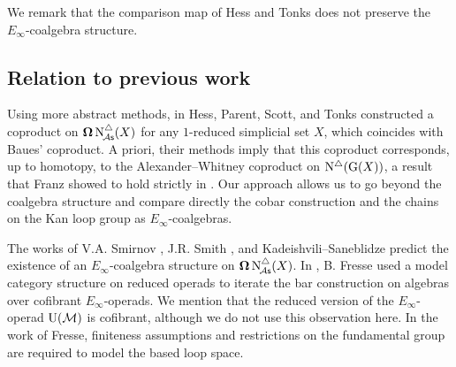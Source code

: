 We remark that the comparison map of Hess and Tonks does not preserve the $E_\infty$-coalgebra structure.

\subsection*{Relation to previous work}

Using more abstract methods, in \cite{hess2006adamshilton} Hess, Parent, Scott, and Tonks constructed a coproduct on $\operatorname{\mathbf{\Omega}} \operatorname{N^{\triangle}_{\!{\mathcal{A}\mathsf{s}}}}(X)$ for any $1$-reduced simplicial set $X$, which coincides with Baues' coproduct.
A priori, their methods imply that this coproduct corresponds, up to homotopy, to the Alexander--Whitney coproduct on $\operatorname{N^{\triangle}}(\operatorname{G}(X))$, a result that Franz showed to hold strictly in \cite{franz2020szczarba}.
Our approach allows us to go beyond the coalgebra structure and compare directly the cobar construction and the chains on the Kan loop group as $E_{\infty}$-coalgebras.

The works of V.A. Smirnov \cite{smirnov1990iterated}, J.R. Smith \cite{smith1994cobar, smith2000operads}, and Kadeishvili–Saneblidze \cite{kadeishvili1998iterating} predict the existence of an $E_\infty$-coalgebra structure on $\operatorname{\mathbf{\Omega}} \operatorname{N^{\triangle}_{\!{\mathcal{A}\mathsf{s}}}}(X)$.
In \cite{fresse2010bar}, B. Fresse used a model category structure on reduced operads \cite{berger2003modelcategory, hinich1997homologicalalgebra} to iterate the bar construction on algebras over cofibrant $E_\infty$-operads.
We mention that the reduced version of the $E_\infty$-operad ${\operatorname{U}(\mathcal{M})}$ is cofibrant, although we do not use this observation here.
In the work of Fresse, finiteness assumptions and restrictions on the fundamental group are required to model the based loop space.

